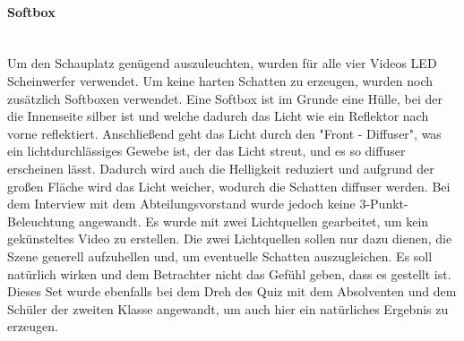 \paragraph{Softbox}
\leavevmode \\
Um den Schauplatz genügend auszuleuchten, wurden für alle vier Videos LED Scheinwerfer verwendet. Um keine harten Schatten zu erzeugen, wurden noch zusätzlich Softboxen verwendet.\newline
Eine Softbox ist im Grunde eine Hülle, bei der die Innenseite silber ist und welche dadurch das Licht wie ein Reflektor nach vorne reflektiert. Anschließend geht das Licht durch den "Front - Diffuser", was
ein lichtdurchlässiges Gewebe ist, der das Licht streut, und es so diffuser erscheinen lässt. Dadurch wird auch die Helligkeit reduziert und aufgrund der großen Fläche wird das Licht weicher, wodurch die Schatten diffuser werden.\citep{softbox}\newline
Bei dem Interview mit dem Abteilungsvorstand wurde jedoch keine 3-Punkt-Beleuchtung angewandt. Es wurde mit zwei Lichtquellen gearbeitet, um kein gekünsteltes Video zu erstellen. Die zwei Lichtquellen sollen nur dazu dienen, die Szene generell aufzuhellen und, um eventuelle Schatten auszugleichen. Es soll natürlich wirken und dem Betrachter nicht das Gefühl geben, dass es gestellt ist.  Dieses Set wurde ebenfalls bei dem Dreh des Quiz mit dem Absolventen und dem Schüler der zweiten Klasse angewandt, um auch hier ein natürliches Ergebnis zu erzeugen.